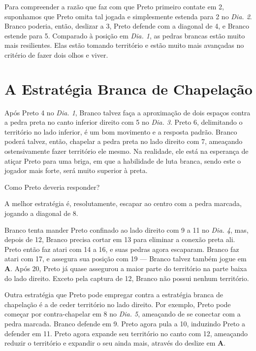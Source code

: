 Para compreender a razão que faz com que Preto primeiro contate em 2, suponhamos que Preto omita tal jogada e simplesmente estenda para 2 no \emph{Dia. 2}. Branco poderia, então, deslizar a 3, Preto defende com a diagonal de 4, e Branco estende para 5. Comparado à posição em \emph{Dia. 1}, as pedras brancas estão muito mais resilientes. Elas estão tomando território e estão muito mais avançadas no critério de fazer dois olhos e viver.

\section{A Estratégia Branca de Chapelação}

Após Preto 4 no \emph{Dia. 1}, Branco talvez faça a aproximação de dois espaços contra a pedra preta no canto inferior direito com 5 no \emph{Dia. 3}. Preto 6, delimitando o território no lado inferior, é um bom movimento e a resposta padrão. Branco poderá talvez, então, chapelar a pedra preta no lado direito com 7, ameaçando ostensivamente fazer território ele mesmo. Na realidade, ele está na esperança de atiçar Preto para uma briga, em que a habilidade de luta branca, sendo este o jogador mais forte, será muito superior à preta.

Como Preto deveria responder?

A melhor estratégia é, resolutamente, escapar ao centro com a pedra marcada, jogando a diagonal de 8.

Branco tenta mander Preto confinado ao lado direito com 9 a 11 no \emph{Dia. 4}, mas, depois de 12, Branco precisa cortar em 13 para eliminar a conexão preta ali. Preto então faz atari com 14 a 16, e suas pedras agora escaparam. Branco faz atari com 17, e assegura sua posição com 19 --- Branco talvez também jogue em \textbf{A}. Após 20, Preto já quase assegurou a maior parte do território na parte baixa do lado direito. Exceto pela captura de 12, Branco não possui nenhum território.

\bigskip

Outra estratégia que Preto pode empregar contra a estratégia branca de chapelação é a de ceder território no lado direito. Por exemplo, Preto pode começar por contra-chapelar em 8 no \emph{Dia. 5}, ameaçando de se conectar com a pedra marcada. Branco defende em 9. Preto agora pula a 10, induzindo Preto a defender em 11. Preto agora expande seu território no canto com 12, ameaçando reduzir o território e expandir o seu ainda mais, através do deslize em \textbf{A}.

